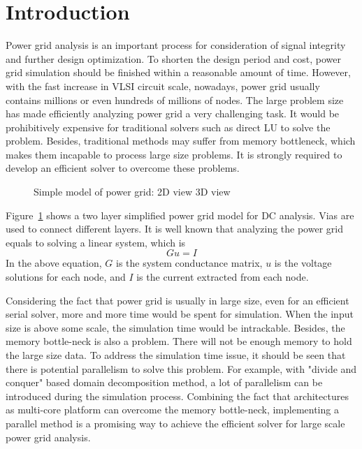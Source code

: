 \documentclass{sig-alternate}
\begin{document}
\section{Introduction}
Power grid analysis is an important process for consideration of signal integrity and further design 
optimization. To shorten the design period and cost, power grid simulation should be finished within a reasonable amount of time. 
However, with the fast increase in VLSI circuit scale, nowadays, power grid usually contains millions or even hundreds of millions 
of nodes. The large problem size has made efficiently analyzing power grid a very challenging task. It would be prohibitively 
expensive for traditional solvers such as direct LU to solve the problem. Besides, traditional methods may suffer from memory 
bottleneck, which makes them incapable to process large size problems. It is strongly required to develop an efficient 
solver to overcome these problems.
	\begin{figure}[htbp]
	  \caption{Simple model of power grid: 
	   2D view
	   3D view}
	  \label{pg_model}
	\end{figure}
Figure~\ref{pg_model} shows a two layer simplified power grid model for DC analysis. Vias are used to 
	connect different layers. It is well known that analyzing the power grid equals to solving a linear system, which is 
	\begin{equation}\label{eq1}
		Gu=I
	\end{equation}
In the above equation, $G$ is the system conductance matrix, $u$ is the voltage solutions for each node, and $I$ is the current 
extracted from each node.

	Considering the fact that power grid is usually in large size, even for an efficient serial solver, more and more time would be
	spent for simulation. When the input size is above some scale, the simulation time would be intrackable.
	Besides, the memory bottle-neck is also a problem. There will not be enough memory to hold the large size data. To address the
	simulation time issue, it should be seen that there is potential parallelism to solve this problem. For example, with "divide and
	conquer" based domain decomposition method, a lot of parallelism can be introduced during the simulation process. Combining the 
	fact that architectures as multi-core platform can overcome the memory bottle-neck, implementing a parallel method is a 
	promising way to achieve the efficient solver for large scale power grid analysis. 
\end{document}
